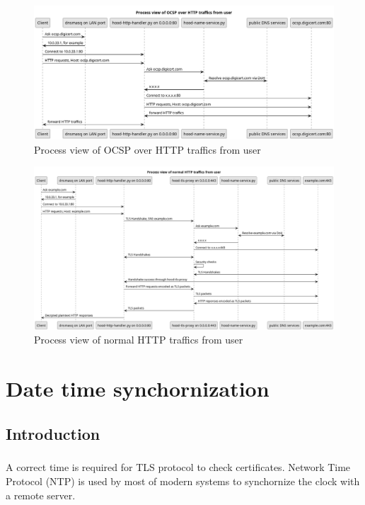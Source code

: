 \documentclass[mscthesis]{usiinfthesis}
\begin{document}
\begin{figure}[H]
  \includegraphics[width=\textheight, angle=90]{graphics/puml/process-ocsp-traffic.png}
  \caption{Process view of OCSP over HTTP traffics from user}
  \label{fig:ocsp-process-view}
\end{figure}

\begin{figure}[H]
  \includegraphics[width=\textheight, angle=90]{graphics/puml/process-http-traffic.png}
  \caption{Process view of normal HTTP traffics from user}
  \label{fig:http-process-view}
\end{figure}

\chapter{Date time synchornization}
\section{Introduction}
\paragraph{}
A correct time is required for TLS protocol to check certificates. Network Time Protocol (NTP) is used by most of modern systems to synchornize the clock with a remote server.
\end{document}
